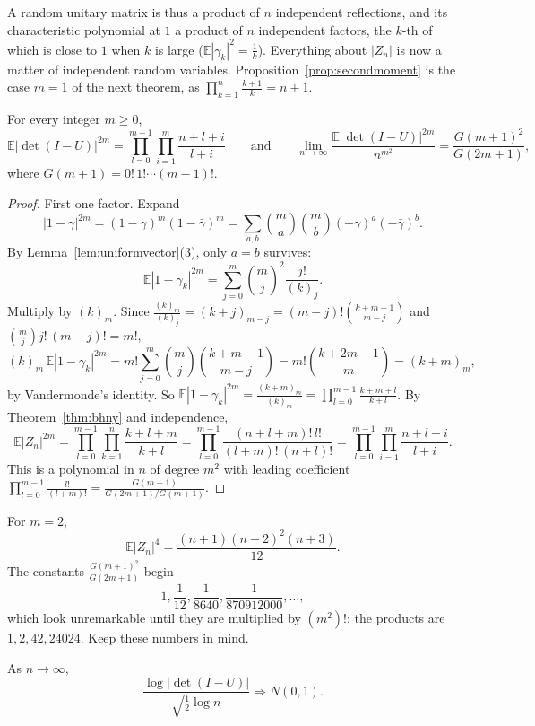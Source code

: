 A random unitary matrix is thus a product of $n$ independent reflections, and its characteristic polynomial at $1$ a product of $n$ independent factors, the $k$-th of which is close to $1$ when $k$ is large ($\mathbb E|\gamma_k|^2=\frac1k$). Everything
about $|Z_n|$ is now a matter of independent random variables. Proposition~\ref{prop:secondmoment} is the case $m=1$ of the next theorem, as $\prod_{k=1}^n\frac{k+1}k=n+1$.

\begin{theorem}\label{thm:ksmoments}
For every integer $m\ge0$,
\[
\mathbb E|\det(I-U)|^{2m}=\prod_{l=0}^{m-1}\prod_{i=1}^m\frac{n+l+i}{l+i}\qquad\text{and}\qquad\lim_{n\to\infty}\frac{\mathbb E|\det(I-U)|^{2m}}{n^{m^2}}=\frac{G(m+1)^2}{G(2m+1)},
\]
where $G(m+1)=0!\,1!\cdots(m-1)!$.
\end{theorem}

\begin{proof}
First one factor. Expand
\[
|1-\gamma|^{2m}=(1-\gamma)^m(1-\bar\gamma)^m=\sum_{a,b}\binom ma\binom mb(-\gamma)^a(-\bar\gamma)^b.
\]
By Lemma~\ref{lem:uniformvector}(3), only $a=b$ survives:
\[
\mathbb E|1-\gamma_k|^{2m}=\sum_{j=0}^m\binom mj^2\frac{j!}{(k)_j}.
\]
Multiply by $(k)_m$. Since $\frac{(k)_m}{(k)_j}=(k+j)_{m-j}=(m-j)!\binom{k+m-1}{m-j}$ and $\binom mjj!\,(m-j)!=m!$,
\[
(k)_m\,\mathbb E|1-\gamma_k|^{2m}=m!\sum_{j=0}^m\binom mj\binom{k+m-1}{m-j}=m!\binom{k+2m-1}m=(k+m)_m,
\]
by Vandermonde's identity. So $\mathbb E|1-\gamma_k|^{2m}=\frac{(k+m)_m}{(k)_m}=\prod_{l=0}^{m-1}\frac{k+m+l}{k+l}$. By Theorem~\ref{thm:bhny} and independence,
\[
\mathbb E|Z_n|^{2m}=\prod_{l=0}^{m-1}\prod_{k=1}^n\frac{k+l+m}{k+l}=\prod_{l=0}^{m-1}\frac{(n+l+m)!\,l!}{(l+m)!\,(n+l)!}=\prod_{l=0}^{m-1}\prod_{i=1}^m\frac{n+l+i}{l+i}.
\]
This is a polynomial in $n$ of degree $m^2$ with leading coefficient $\prod_{l=0}^{m-1}\frac{l!}{(l+m)!}=\frac{G(m+1)}{G(2m+1)/G(m+1)}$.
\end{proof}

For $m=2$,
\[
\mathbb E|Z_n|^4=\frac{(n+1)(n+2)^2(n+3)}{12}.
\]
The constants $\frac{G(m+1)^2}{G(2m+1)}$ begin
\[
1,\frac1{12},\frac1{8640},\frac1{870912000},\dots,
\]
which look unremarkable until they are multiplied by $(m^2)!$: the
products are $1,2,42,24024$. Keep these numbers in mind.

\begin{theorem}\label{thm:logclt}
As $n\to\infty$,
\[
\frac{\log|\det(I-U)|}{\sqrt{\frac12\log n}}\Longrightarrow N(0,1).
\]
\end{theorem}

